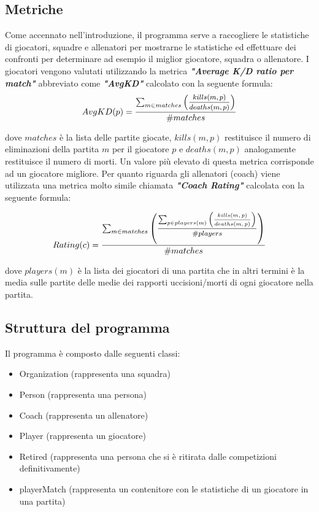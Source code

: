 \documentclass[a4paper, 11pt]{article}
\begin{document}
\subsection{Metriche}
Come accennato nell'introduzione, il programma serve a raccogliere le statistiche di giocatori, squadre e allenatori per mostrarne le statistiche ed effettuare dei confronti per determinare ad esempio il miglior giocatore, squadra o allenatore.
I giocatori vengono valutati utilizzando la metrica \textit{\textbf{"Average K/D ratio per match"}} abbreviato come \textit{\textbf{"AvgKD"}} calcolato con la seguente formula:
\begin{displaymath}
AvgKD(p) = \frac{ \sum_{m\in matches} \left(\mfrac{kills(m,p)}{deaths(m,p)}\right)}{\#matches}
\end{displaymath}

dove $matches$ è la lista delle partite giocate, $kills(m,p)$ restituisce il numero di eliminazioni della partita $m$ per il giocatore $p$ e $deaths(m,p)$ analogamente restituisce il numero di morti.
Un valore più elevato di questa metrica corrisponde ad un giocatore migliore.
Per quanto riguarda gli allenatori (coach) viene utilizzata una metrica molto simile chiamata \textit{\textbf{"Coach Rating"}} calcolata con la seguente formula:

\begin{displaymath}
Rating(c) = \frac{ \sum_{m\in matches} \left(\mfrac{\sum_{p\in players(m)} \left(\mfrac{kills(m,p)}{deaths(m,p)}\right)}{\#players}\right)}{\#matches}
\end{displaymath}

dove $players(m)$ è la lista dei giocatori di una partita
che in altri termini è la media sulle partite delle medie dei rapporti uccisioni/morti di ogni giocatore nella partita.

\subsection{Struttura del programma}

Il programma è composto dalle seguenti classi:
\begin{itemize}
\item Organization (rappresenta una squadra)
\item Person (rappresenta una persona)
\item Coach (rappresenta un allenatore)
\item Player (rappresenta un giocatore)
\item Retired (rappresenta una persona che si è ritirata dalle competizioni definitivamente)
\item playerMatch (rappresenta un contenitore con le statistiche di un giocatore in una partita)
\end{itemize}
\end{document}

